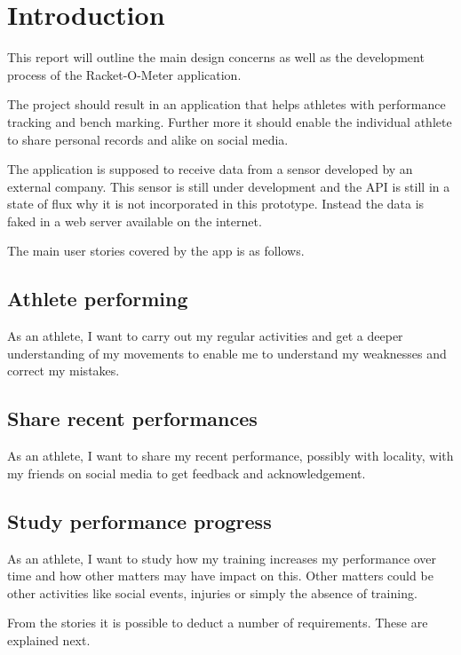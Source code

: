 \chapter{Introduction}
This report will outline the main design concerns as well as the development process of the Racket-O-Meter application.

The project should result in an application that helps athletes with performance tracking and bench marking. Further more it should enable the individual athlete to share personal records and alike on social media.

The application is supposed to receive data from a sensor developed by an external company. This sensor is still under development and the API is still in a state of flux why it is not incorporated in this prototype. Instead the data is faked in a web server available on the internet.

The main user stories covered by the app is as follows.

\section*{Athlete performing}
As an athlete, I want to carry out my regular activities and get a deeper understanding of my movements to enable me to understand my weaknesses and correct my mistakes.

\section*{Share recent performances}
As an athlete, I want to share my recent performance, possibly with locality, with my friends on social media to get feedback and acknowledgement.

\section*{Study performance progress}
As an athlete, I want to study how my training increases my performance over time and how other matters may have impact on this.
Other matters could be other activities like social events, injuries or simply the absence of training.

From the stories it is possible to deduct a number of requirements. These are explained next.
